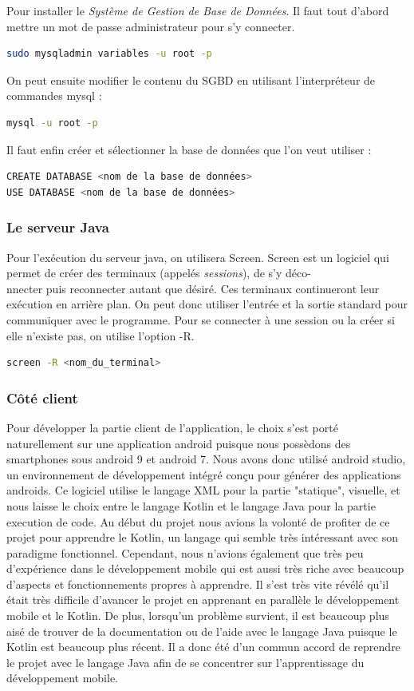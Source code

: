 Pour installer le \emph{Système de Gestion de Base de Données}. Il faut tout d'abord mettre un mot de passe administrateur
pour s'y connecter.
\begin{lstlisting}[language=bash]
sudo mysqladmin variables -u root -p
\end{lstlisting}
On peut ensuite modifier le contenu du SGBD en utilisant l'interpréteur de commandes mysql :
\begin{lstlisting}[language=bash]
mysql -u root -p
\end{lstlisting}
Il faut enfin créer et sélectionner la base de données que l'on veut utiliser :
\begin{lstlisting}[language=bash]
CREATE DATABASE <nom de la base de données>
USE DATABASE <nom de la base de données>
\end{lstlisting}


\subsubsection{Le serveur Java}

Pour l'exécution du serveur java, on utilisera Screen.
Screen est un logiciel qui permet de créer des terminaux (appelés \emph{sessions}), de s'y déco-\\nnecter puis reconnecter autant que désiré.
Ces terminaux continueront leur exécution en arrière plan. On peut donc utiliser l'entrée et la sortie standard pour communiquer avec le programme.
Pour se connecter à une session ou la créer si elle n'existe pas, on utilise l'option -R.
\begin{lstlisting}[language=bash]
    screen -R <nom_du_terminal>
\end{lstlisting}

\subsubsection{Côté client}
Pour développer la partie client de l'application, le choix s'est porté naturellement sur une application android puisque nous possèdons des
smartphones sous android 9 et android 7. Nous avons donc utilisé android studio, un environnement de développement intégré conçu pour générer
des applications androids. Ce logiciel utilise le langage XML pour la partie "statique", visuelle, et nous laisse le choix entre le langage
Kotlin et le langage Java pour la partie execution de code. Au début du projet nous avions la volonté de profiter de ce projet pour apprendre
le Kotlin, un langage qui semble très intéressant avec son paradigme fonctionnel. Cependant, nous n'avions également que très peu d'expérience
dans le développement mobile qui est aussi très riche avec beaucoup d'aspects et fonctionnements propres à apprendre. Il s'est très vite révélé
qu'il était très difficile d'avancer le projet en apprenant en parallèle le développement mobile et le Kotlin. De plus, lorsqu'un problème
survient, il est beaucoup plus aisé de trouver de la documentation ou de l'aide avec le langage Java puisque le Kotlin est beaucoup plus récent.
Il a donc été d'un commun accord de reprendre le projet avec le langage Java afin de se concentrer sur l'apprentissage du développement mobile.

